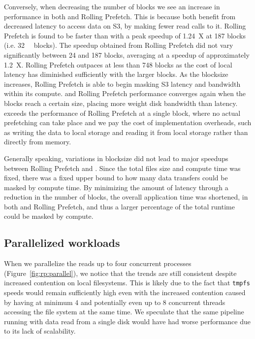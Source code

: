 Conversely, when decreasing the number of blocks we see an increase in
performance in both \sfs and Rolling Prefetch. This is because both benefit from
decreased latency to access data on S3, by making fewer read calls to it.
Rolling Prefetch is found to be faster than \sfs with a peak speedup of 1.24~X
at 187 blocks (i.e. \SI{32}{\mebi\byte} blocks). The speedup obtained from
Rolling Prefetch did not vary significantly between 24 and 187 blocks, averaging
at a speedup of approximately 1.2~X. Rolling Prefetch outpaces \sfs at less than
748 blocks as the cost of local latency has diminished sufficiently with the
larger blocks. As the blocksize increases, Rolling Prefetch is able to begin
masking S3 latency and bandwidth within its compute.
\sfs and Rolling Prefetch performance converges again when the blocks reach a
certain size, placing more weight disk bandwidth than latency. \sfs exceeds the
performance of Rolling Prefetch at a single block, where no actual prefetching
can take place and we pay the cost of implementation overheads, such as writing
the data to local storage and reading it from local storage rather than directly
from memory.

Generally speaking, variations in blocksize did not lead to major speedups
between Rolling Prefetch and \sfs. Since the total files size and compute time
was fixed, there was a fixed upper bound to how many data transfers could be
masked by compute time. By minimizing the amount of latency through a reduction
in the number of blocks, the overall application time was shortened, in both
\sfs and Rolling Prefetch, and thus a larger percentage of the total runtime
could be masked by compute.

\subsection{Parallelized workloads}
When we parallelize the reads up to four concurrent processes
(Figure~\ref{fig:rp:parallel}), we notice that the trends are still consistent
despite increased contention on local filesystems. This is likely due to the
fact that \texttt{tmpfs} speeds would remain sufficiently high even with the
increased contention caused by having at minimum 4 and potentially even up to 8
concurrent threads accessing the file system at the same time. We speculate that
the same pipeline running with data read from a single disk would have had worse
performance due to its lack of scalability.

